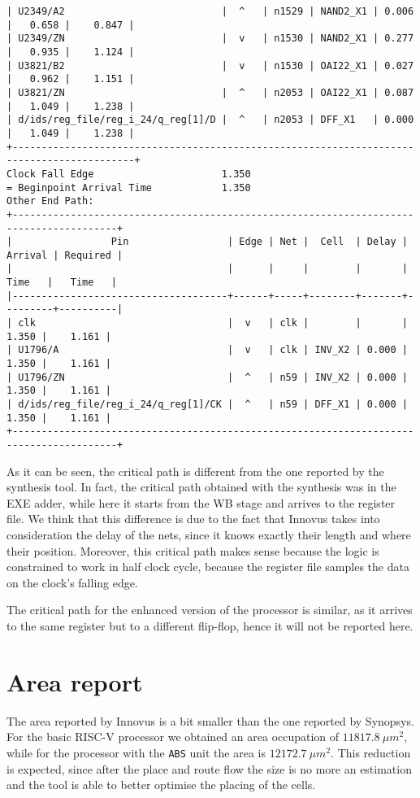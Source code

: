 \begin{Verbatim}[fontsize=\small]
| U2349/A2                           |  ^   | n1529 | NAND2_X1 | 0.006 |   0.658 |    0.847 | 
| U2349/ZN                           |  v   | n1530 | NAND2_X1 | 0.277 |   0.935 |    1.124 | 
| U3821/B2                           |  v   | n1530 | OAI22_X1 | 0.027 |   0.962 |    1.151 | 
| U3821/ZN                           |  ^   | n2053 | OAI22_X1 | 0.087 |   1.049 |    1.238 | 
| d/ids/reg_file/reg_i_24/q_reg[1]/D |  ^   | n2053 | DFF_X1   | 0.000 |   1.049 |    1.238 | 
+-------------------------------------------------------------------------------------------+ 
Clock Fall Edge                      1.350
= Beginpoint Arrival Time            1.350
Other End Path:
+----------------------------------------------------------------------------------------+ 
|                 Pin                 | Edge | Net |  Cell  | Delay | Arrival | Required | 
|                                     |      |     |        |       |  Time   |   Time   | 
|-------------------------------------+------+-----+--------+-------+---------+----------| 
| clk                                 |  v   | clk |        |       |   1.350 |    1.161 | 
| U1796/A                             |  v   | clk | INV_X2 | 0.000 |   1.350 |    1.161 | 
| U1796/ZN                            |  ^   | n59 | INV_X2 | 0.000 |   1.350 |    1.161 | 
| d/ids/reg_file/reg_i_24/q_reg[1]/CK |  ^   | n59 | DFF_X1 | 0.000 |   1.350 |    1.161 | 
+----------------------------------------------------------------------------------------+ 
\end{Verbatim}

As it can be seen, the critical path is different from the one reported by the synthesis tool. In fact,
the critical path obtained with the synthesis was in the EXE adder, while here it starts from the WB stage
and arrives to the register file. We think that this difference is due to the fact that Innovus takes into
consideration the delay of the nets, since it knows exactly their length and where their position.
Moreover, this critical path makes sense because the logic is constrained to work in half clock cycle, because
the register file samples the data on the clock's falling edge.

The critical path for the enhanced version of the processor is similar, as it arrives to the same register
but to a different flip-flop, hence it will not be reported here.

\section{Area report}

The area reported by Innovus is a bit smaller than the one reported by Synopsys. For the basic RISC-V processor
we obtained an area occupation of $11817.8\ \mu m^2$, while for the processor with the \verb|ABS| unit the 
area is $12172.7\ \mu m^2$. This reduction is expected, since after the place and route flow the size is no more
an estimation and the tool is able to better optimise the placing of the cells.